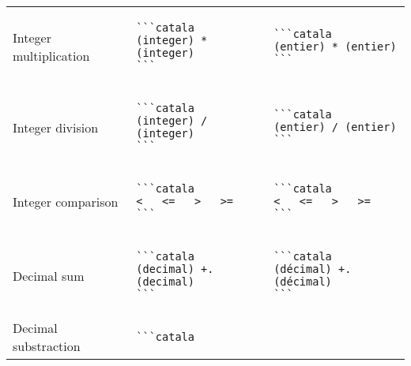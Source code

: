 \documentclass[a3paper,landscape]{article}
\begin{document}
\begin{multicols*}{2}
\begin{center}
\begin{tabular}{p{}p{}p{}}
\\
Integer multiplication&
\vspace*{-1.75em}
\begin{verbatim}
```catala
(integer) * (integer)
```
\end{verbatim}
\vspace*{-1.75em}
&
\vspace*{-1.75em}
\begin{verbatim}
```catala
(entier) * (entier)
```
\end{verbatim}
\vspace*{-1.75em}
\\
Integer division&
\vspace*{-1.75em}
\begin{verbatim}
```catala
(integer) / (integer)
```
\end{verbatim}
\vspace*{-1.75em}
&
\vspace*{-1.75em}
\begin{verbatim}
```catala
(entier) / (entier)
```
\end{verbatim}
\vspace*{-1.75em}
\\
Integer comparison&
\vspace*{-1.75em}
\begin{verbatim}
```catala
<   <=   >   >=
```
\end{verbatim}
\vspace*{-1.75em}
&
\vspace*{-1.75em}
\begin{verbatim}
```catala
<   <=   >   >=
```
\end{verbatim}
\vspace*{-1.75em}
\\
Decimal sum&
\vspace*{-1.75em}
\begin{verbatim}
```catala
(decimal) +. (decimal)
```
\end{verbatim}
\vspace*{-1.75em}
&
\vspace*{-1.75em}
\begin{verbatim}
```catala
(décimal) +. (décimal)
```
\end{verbatim}
\vspace*{-1.75em}
\\
Decimal substraction&
\vspace*{-1.75em}
\begin{verbatim}
```catala

\end{verbatim}
\end{tabular}
\end{center}
\end{multicols*}
\end{document}
